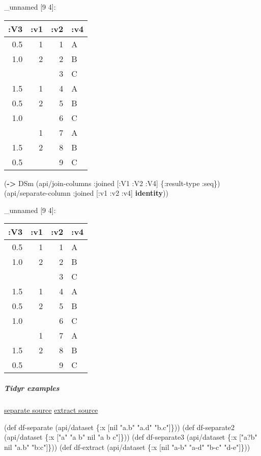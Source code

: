 \documentclass[]{article}
\newenvironment{Shaded}{\begin{snugshade}}{\end{snugshade}}
\newcommand{\KeywordTok}[1]{\textcolor[rgb]{0.13,0.29,0.53}{\textbf{#1}}}
\newcommand{\StringTok}[1]{\textcolor[rgb]{0.31,0.60,0.02}{#1}}
\newcommand{\FunctionTok}[1]{\textcolor[rgb]{0.00,0.00,0.00}{#1}}
\newcommand{\VariableTok}[1]{\textcolor[rgb]{0.00,0.00,0.00}{#1}}
\newcommand{\BuiltInTok}[1]{#1}
\newcommand{\AttributeTok}[1]{\textcolor[rgb]{0.77,0.63,0.00}{#1}}
\newcommand{\NormalTok}[1]{#1}
\let\oldsubparagraph\subparagraph
\renewcommand{\subparagraph}[1]{\oldsubparagraph{#1}\mbox{}}
\begin{document}
\_unnamed {[}9 4{]}:

\begin{longtable}[]{@{}rrrl@{}}
\toprule
:V3 & :v1 & :v2 & :v4\tabularnewline
\midrule
\endhead
0.5 & 1 & 1 & A\tabularnewline
1.0 & 2 & 2 & B\tabularnewline
& & 3 & C\tabularnewline
1.5 & 1 & 4 & A\tabularnewline
0.5 & 2 & 5 & B\tabularnewline
1.0 & & 6 & C\tabularnewline
& 1 & 7 & A\tabularnewline
1.5 & 2 & 8 & B\tabularnewline
0.5 & & 9 & C\tabularnewline
\bottomrule
\end{longtable}

\begin{Shaded}
\begin{Highlighting}[]
\NormalTok{(}\KeywordTok{->}\NormalTok{ DSm}
\NormalTok{    (api/join-columns }\AttributeTok{:joined}\NormalTok{ [}\AttributeTok{:V1} \AttributeTok{:V2} \AttributeTok{:V4}\NormalTok{] \{}\AttributeTok{:result-type} \AttributeTok{:seq}\NormalTok{\})}
\NormalTok{    (api/separate-column }\AttributeTok{:joined}\NormalTok{ [}\AttributeTok{:v1} \AttributeTok{:v2} \AttributeTok{:v4}\NormalTok{] }\KeywordTok{identity}\NormalTok{))}
\end{Highlighting}
\end{Shaded}

\_unnamed {[}9 4{]}:

\begin{longtable}[]{@{}rrrl@{}}
\toprule
:V3 & :v1 & :v2 & :v4\tabularnewline
\midrule
\endhead
0.5 & 1 & 1 & A\tabularnewline
1.0 & 2 & 2 & B\tabularnewline
& & 3 & C\tabularnewline
1.5 & 1 & 4 & A\tabularnewline
0.5 & 2 & 5 & B\tabularnewline
1.0 & & 6 & C\tabularnewline
& 1 & 7 & A\tabularnewline
1.5 & 2 & 8 & B\tabularnewline
0.5 & & 9 & C\tabularnewline
\bottomrule
\end{longtable}

\subparagraph{Tidyr examples}\label{tidyr-examples-1}

\href{https://tidyr.tidyverse.org/reference/separate.html}{separate
source}
\href{https://tidyr.tidyverse.org/reference/extract.html}{extract
source}

\begin{Shaded}
\begin{Highlighting}[]
\NormalTok{(}\BuiltInTok{def}\FunctionTok{ df-separate }\NormalTok{(api/dataset \{}\AttributeTok{:x}\NormalTok{ [}\VariableTok{nil} \StringTok{"a.b"} \StringTok{"a.d"} \StringTok{"b.c"}\NormalTok{]\}))}
\NormalTok{(}\BuiltInTok{def}\FunctionTok{ df-separate2 }\NormalTok{(api/dataset \{}\AttributeTok{:x}\NormalTok{ [}\StringTok{"a"} \StringTok{"a b"} \VariableTok{nil} \StringTok{"a b c"}\NormalTok{]\}))}
\NormalTok{(}\BuiltInTok{def}\FunctionTok{ df-separate3 }\NormalTok{(api/dataset \{}\AttributeTok{:x}\NormalTok{ [}\StringTok{"a?b"} \VariableTok{nil} \StringTok{"a.b"} \StringTok{"b:c"}\NormalTok{]\}))}
\NormalTok{(}\BuiltInTok{def}\FunctionTok{ df-extract }\NormalTok{(api/dataset \{}\AttributeTok{:x}\NormalTok{ [}\VariableTok{nil} \StringTok{"a-b"} \StringTok{"a-d"} \StringTok{"b-c"} \StringTok{"d-e"}\NormalTok{]\}))}
\end{Highlighting}
\end{Shaded}
\end{document}

